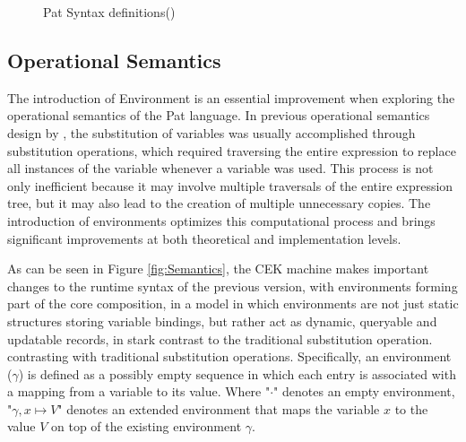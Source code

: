\documentclass{l4proj}
\begin{document}
\vspace{-1\baselineskip} 
\begin{figure}[ht]
    \caption{Pat Syntax definitions(\cite{fowler_2023_special})}
    \label{fig:Syntax}
\end{figure}

\subsection{Operational Semantics}

The introduction of Environment is an essential improvement when exploring the operational semantics of the Pat language. In previous operational semantics design by \cite{fowler_2023_special}, the substitution of variables was usually accomplished through substitution operations, which required traversing the entire expression to replace all instances of the variable whenever a variable was used. This process is not only inefficient because it may involve multiple traversals of the entire expression tree, but it may also lead to the creation of multiple unnecessary copies. The introduction of environments optimizes this computational process and brings significant improvements at both theoretical and implementation levels.

As can be seen in Figure \ref{fig:Semantics}, the CEK machine makes important changes to the runtime syntax of the previous version, with environments forming part of the core composition, in a model in which environments are not just static structures storing variable bindings, but rather act as dynamic, queryable and updatable records, in stark contrast to the traditional substitution operation. contrasting with traditional substitution operations. Specifically, an environment ($\gamma$) is defined as a possibly empty sequence in which each entry is associated with a mapping from a variable to its value. Where "$\cdot$" denotes an empty environment, "$\gamma, x \mapsto V$" denotes an extended environment that maps the variable $x$ to the value $V$ on top of the existing environment $\gamma$.
\end{document}
